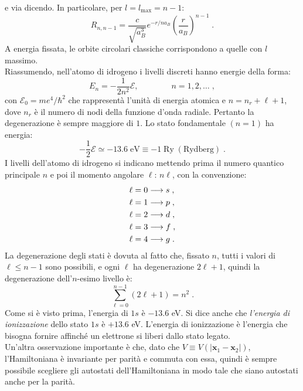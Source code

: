 \documentclass[12pt,a4paper]{report}
\theoremstyle{definition}
\numberwithin{equation}{section}
\begin{document}
e via dicendo. In particolare, per $l=l_{\mathrm{max}}=n-1$:
\begin{equation}
R_{n,n-1}=\frac{c}{\sqrt{a_B^3}}e^{-r/na_B}\left(\frac{r}{a_B}\right)^{n-1}\;.
\end{equation}
A energia fissata, le orbite circolari classiche corrispondono a quelle con $l$ massimo. \\
Riassumendo, nell'atomo di idrogeno i livelli discreti hanno energie della forma:
\begin{equation}
E_n=-\frac{1}{2n^2}\mathcal{E},\qquad\qquad n=1,2,\ldots\;,
\end{equation}
con $\mathcal{E}_0=me^4/\hbar^2$ che rappresentà l'unità di energia atomica e $n=n_r+\ell+1$, dove $n_r$ è il numero di nodi della funzione d'onda radiale. Pertanto la degenerazione è sempre maggiore di $1$. Lo stato fondamentale $(n=1)$ ha energia:
\begin{equation}
-\frac{1}{2}\mathcal{E}\simeq -13.6\;\mbox{eV}\equiv -1\;\mbox{Ry}\;(\mbox{Rydberg})\;.
\end{equation}
I livelli dell'atomo di idrogeno si indicano mettendo prima il numero quantico principale $n$ e poi il momento angolare $\ell$: $n\ell$, con la convenzione:
\begin{align}
\ell=0 &\longrightarrow s \notag\;, \\
\ell=1 &\longrightarrow p \notag\;, \\
\ell=2 &\longrightarrow d \notag\;, \\
\ell=3 &\longrightarrow f \notag\;, \\
\ell=4 &\longrightarrow g\;.
\end{align}
La degenerazione degli stati è dovuta al fatto che, fissato $n$, tutti i valori di $\ell\le n-1$ sono possibili, e ogni $\ell$ ha degenerazione $2\ell+1$, quindi la degenerazione dell'$n$-esimo livello è:
\begin{equation}
\sum_{\ell=0}^{n-1} (2\ell+1)=n^2\;.
\end{equation}
Come si è visto prima, l'energia di $1s$ è $-13.6$ eV. Si dice anche che \textit{l'energia di ionizzazione} dello stato $1s$ è $+13.6$ eV. L'energia di ionizzazione è l'energia che bisogna fornire affinché un elettrone si liberi dallo stato legato. \\
Un'altra osservazione importante è che, dato che $V\equiv V(|\mathbf{x}_1-\mathbf{x}_2|)$, l'Hamiltoniana è invariante per parità e commuta con essa, quindi è sempre possibile scegliere gli autostati dell'Hamiltoniana in modo tale che siano autostati anche per la parità.
\end{document}
